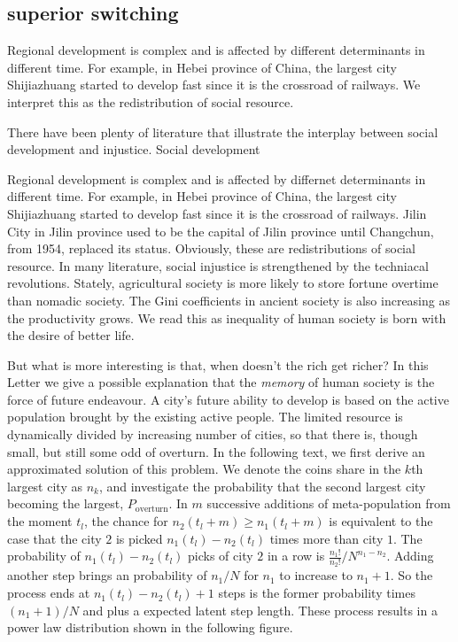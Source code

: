 \documentclass[aps,prl]{revtex4-2}
\begin{document}
\subsection{superior switching} 

Regional development is complex and is affected by different determinants in different time. For example, in Hebei province of China, the largest city Shijiazhuang started to develop fast since it is the crossroad of railways. We interpret this as the redistribution of social resource. 

There have been plenty of literature\cite{bowles2019neolithic} that illustrate the interplay between social development and injustice. Social development 

Regional development is complex and is affected by differnet determinants in different time. For example, in Hebei province of China, the largest city Shijiazhuang started to develop fast since it is the crossroad of railways. Jilin City in Jilin province used to be the capital of Jilin province until Changchun, from 1954, replaced its status. Obviously, these are redistributions of social resource. In many literature, social injustice is strengthened by the techniacal revolutions. Stately, agricultural society is more likely to store fortune overtime than nomadic society\cite{doi:10.1086/701789}. The Gini coefficients in ancient society is also increasing as the productivity grows\cite{kohler2017greater}. We read this as inequality of human society is born with the desire of better life. 

But what is more interesting is that, when doesn't the rich get richer? In this Letter we give a possible explanation that the \emph{memory} of human society is the force of future endeavour. A city's future ability to develop is based on the active population brought by the existing active people. The limited resource is dynamically divided by increasing number of cities, so that there is, though small, but still some odd of overturn. In the following text, we first derive an approximated solution of this problem. We denote the coins share in the $k$th largest city as $n_k$, and investigate the probability that the second largest city becoming the largest, $P_{\text{overturn}}$. In $m$ successive additions of meta-population from the moment $t_l$, the chance for $n_2(t_l+m)\ge n_1(t_l+m)$ is equivalent to the case that the city $2$ is picked $n_1(t_l)-n_2(t_l)$ times more than city $1$. The probability of $n_1(t_l)-n_2(t_l)$ picks of city $2$ in a row is $\frac{n_1!}{n_2!}/N^{n_1-n_2}$. Adding another step brings an probability of $n_1/N$ for $n_1$ to increase to $n_1+1$. So the process ends at $n_1(t_l)-n_2(t_l)+1$ steps is the former probability times $(n_1+1)/N$ and plus a expected latent step length. These process results in a power law distribution shown in the following figure.
\end{document}
